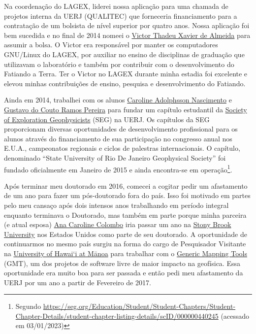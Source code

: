 \documentclass[10pt,a4paper,oneside]{book}
\newcommand{\UHM}{University of Hawai`i at M\={a}noa}
\begin{document}
Na coordenação do LAGEX, liderei nossa aplicação para uma chamada de projetos
interna da UERJ (QUALITEC) que forneceria financiamento para a
contratação de um bolsista de nível superior por quatro anos.
Nossa aplicação foi bem sucedida e no final de 2014 nomeei o
\href{https://www.linkedin.com/in/victorxalmeida/}{Victor Thadeu Xavier de Almeida}
para assumir a bolsa.
O Victor era responsável por manter os computadores GNU/Linux do LAGEX,
por auxiliar no ensino de disciplinas de graduação que utilizavam o
laboratório e também por contribuir com o desenvolvimento do Fatiando a Terra.
Ter o Victor no LAGEX durante minha estadia foi excelente e elevou minhas
contribuições de ensino, pesquisa e desenvolvimento do Fatiando.

Ainda em 2014, trabalhei com os alunos
\href{https://www.linkedin.com/in/caroline-adolphsson-61723137/}{Caroline Adolphsson Nascimento}
e \href{https://www.linkedin.com/in/gustavo-pereira-780839111/}{Gustavo do Couto Ramos Pereira}
para fundar um capítulo estudantil da
\href{https://seg.org}{Society of Exploration Geophysicists} (SEG) na UERJ.
Os capítulos da SEG proporcionam diversas oportunidades de desenvolvimento
profissional para os alunos através do financiamento de sua participação no
congresso anual nos E.U.A., campeonatos regionais e ciclos de palestras
internacionais.
O capítulo, denominado ``State University of Rio De Janeiro Geophysical
Society'' foi fundado oficialmente em Janeiro de 2015 e ainda encontra-se em
operação\footnote{Segundo \url{https://seg.org/Education/Student/Student-Chapters/Student-Chapter-Details/student-chapter-listing-details/scID/000000440245} (acessado em 03/01/2023)}.

Após terminar meu doutorado em 2016, comecei a cogitar pedir um afastamento de
um ano para fazer um pós-doutorado fora do país.
Isso foi motivado em partes pelo meu cansaço após dois intensos anos
trabalhando em período integral enquanto terminava o Doutorado, mas também em
parte porque minha parceira (e atual esposa)
\href{https://www.acarolcolombo.com/}{Ana Caroline Colombo} iria passar um ano
na \href{https://www.stonybrook.edu/}{Stony Brook University} nos Estados
Unidos como parte de seu doutorado.
A oportunidade de continuarmos no mesmo país surgiu na forma do cargo de
Pesquisador Visitante na
\href{https://www.hawaii.edu/}{\UHM{}} para trabalhar com o
\href{https://www.generic-mapping-tools.org/}{Generic Mapping Tools} (GMT),
um dos projetos de software livre de maior impacto na geofísica.
Essa oportunidade era muito boa para ser passada e então pedi meu afastamento
da UERJ por um ano a partir de Fevereiro de 2017.
\end{document}
